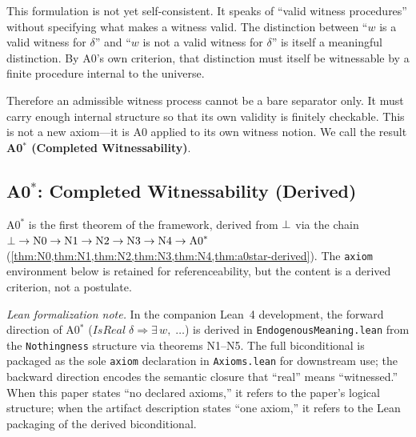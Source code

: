 This formulation is not yet self-consistent.  It speaks of ``valid witness
procedures'' without specifying what makes a witness valid.  The distinction
between ``$w$ is a valid witness for $\delta$'' and ``$w$ is not a valid
witness for $\delta$'' is itself a meaningful distinction.  By A0's own
criterion, that distinction must itself be witnessable by a finite
procedure internal to the universe.

Therefore an admissible witness process cannot be a bare separator only.
It must carry enough internal structure so that its own validity is finitely
checkable.  This is not a new axiom---it is A0 applied to its own witness
notion.  We call the result \textbf{A0$^*$ (Completed Witnessability)}.

\subsection{A0$^*$: Completed Witnessability (Derived)}
\label{sec:axioms:a0star}

\begin{remark}
\label{rem:a0star-derived-status}
A0$^*$ is the first theorem of the framework, derived from $\bot$ via
the chain $\bot \to \text{N0} \to \text{N1} \to \text{N2} \to
\text{N3} \to \text{N4} \to \text{A0}^*$
(\cref{thm:N0,thm:N1,thm:N2,thm:N3,thm:N4,thm:a0star-derived}).
The \texttt{axiom} environment below is retained for referenceability,
but the content is a derived criterion, not a postulate.

\medskip\noindent
\emph{Lean formalization note.}
In the companion Lean~4 development, the forward direction of
A0$^*$ ($\mathit{IsReal}\;\delta \Rightarrow \exists\, w,\;\ldots$) is
derived in \texttt{EndogenousMeaning.lean} from the
\texttt{Nothingness} structure via theorems N1--N5.  The full
biconditional is packaged as the sole \texttt{axiom} declaration in
\texttt{Axioms.lean} for downstream use; the backward direction
encodes the semantic closure that ``real'' means ``witnessed.''
When this paper states ``no declared axioms,'' it refers to the
paper's logical structure; when the artifact description states
``one axiom,'' it refers to the Lean packaging of the derived
biconditional.
\end{remark}

